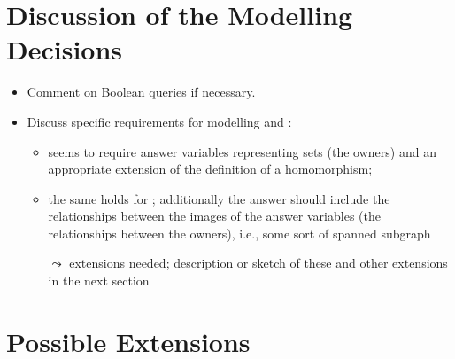 

\section{Discussion of the Modelling Decisions}
\label{sec:modelling_discussion}

%
\begin{itemize}
  \item
    Comment on Boolean queries if necessary.
  \item
    Discuss specific requirements for modelling  and : 
    \begin{itemize}
      \item 
         seems to require answer variables representing sets (the owners)
        and an appropriate extension of the definition of a homomorphism;
      \item 
        the same holds for ; additionally the answer should include the relationships
        between the images of the answer variables (the relationships between the owners),
        i.e., some sort of spanned subgraph
      \item[$\leadsto$]
        extensions needed; description or sketch of these and other extensions in the next section
    \end{itemize}
\end{itemize}



\section{Possible Extensions}
\label{sec:possible_extensions}

